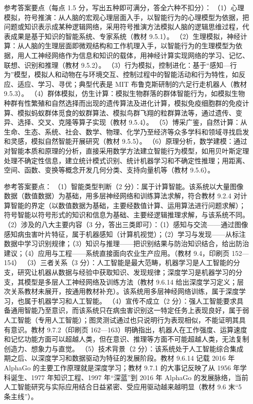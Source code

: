 \documentclass[a4paper,11pt]{article}
\begin{document}
\q 参考答案要点（每点 1.5 分，写出五种即可满分，答全六种不扣分）：
（1）心理模拟，符号推演：从人脑的宏观心理层面入手，以智能行为的心理模型为依据，把问题或知识表示成某种逻辑网络，采用符号推演方法模拟人脑的逻辑思维过程，代表成果是基于知识的智能系统、专家系统（教材 9.5.1）。
（2）生理模拟，神经计算：从人脑的生理层面即微观结构和工作机理入手，以智能行为的生理模型为依据，用人工神经网络作为信息和知识的载体，用神经计算实现网络的学习、记忆、联想、识别和推理（教材 9.5.2）。
（3）行为模拟，控制进化：基于“感知—行为”模型，模拟人和动物在与环境交互、控制过程中的智能活动和行为特性，如反应、适应、学习、寻优；典型代表是 MIT 布鲁克斯研制的六足行走机器人（教材 9.5.3）。
（4）群体模拟，仿生计算：模拟生物群落的群体智能行为，如模拟生物种群有性繁殖和自然选择而出现的遗传算法及进化计算，模拟免疫细胞群的免疫计算、模拟蚂蚁群体觅食的蚁群算法、模拟鸟群飞翔的粒群算法等，通过遗传、变异、选择、交叉、克隆等算子实现（教材 9.5.4）。
（5）博采广鉴，自然计算：从生命、生态、系统、社会、数学、物理、化学乃至经济等众多学科和领域寻找启发和灵感，模拟自然智能开展研究（教材 9.5.5）。
（6）原理分析，数学建模：通过对智能本质和原理的分析，直接采用数学方法建立智能行为模型，如用贝叶斯定理处理不确定性信息，建立统计模式识别、统计机器学习和不确定性推理；用距离、空间、函数、变换等概念开发几何分类、支持向量机等（教材 9.5.6）。


\q 参考答案要点：
（1）智能类型判断（2 分）：属于计算智能。该系统以大量图像数据（数值数据）为基础，用多层神经网络和训练算法求解，符合教材 9.2.4 对计算智能的界定（以数值数据为基础，主要经数值计算、运用算法进行问题求解）；符号智能以符号形式的知识和信息为基础、主要经逻辑推理求解，与该系统不同。
（2）涉及的八大主要内容（3 分，答出三类即可）：（1）感知与交流——通过图像感知病虫害叶片特征，属于机器感知（计算机视觉）；（2）学习与发现——从标注数据中学习识别规律；（3）知识与推理——把识别结果与防治知识结合，给出防治建议；（4）应用与工程——系统直接面向农业生产应用。（教材 9.4，印刷页 152—154）
（3）三者关系（3 分）：人工智能是最大范畴，机器学习是人工智能的分支，研究让机器从数据与经验中获取知识、发现规律；深度学习是机器学习的分支，其模型是多层人工神经网络及训练方法（教材 9.6.14 给出深度学习定义；层次关系教材未展开，按通用教材补充）。该系统用多层神经网络训练，属于深度学习，也属于机器学习和人工智能。
（4）宣传不成立（2 分）：强人工智能要求具备通用智能乃至意识，而该系统只在病虫害识别这一特定任务上表现良好，属于弱人工智能（专用人工智能）；图灵测试通过也只说明行为表现相似，不能证明其具有意识。教材 9.7.2（印刷页 162—163）明确指出，机器人在工作强度、运算速度和记忆功能方面可以超越人类，但在意识、推理等方面不可能超越人类，无法复制创造力、想象力与直觉。
（5）技术背景（2 分）：该系统处于人工智能综合集成期之后、以深度学习和数据驱动为特征的发展阶段。教材 9.6.14 记载 2016 年 AlphaGo 的主要工作原理就是深度学习；教材 9.7.1 的大事记反映了从 1956 年学科诞生、1977 年知识工程、1997 年“深蓝”到 2016 年 AlphaGo 的发展脉络，当前人工智能研究与实际应用结合日益紧密、受应用驱动越来越明显（教材 9.6 末“5 条主线”）。
\end{document}
